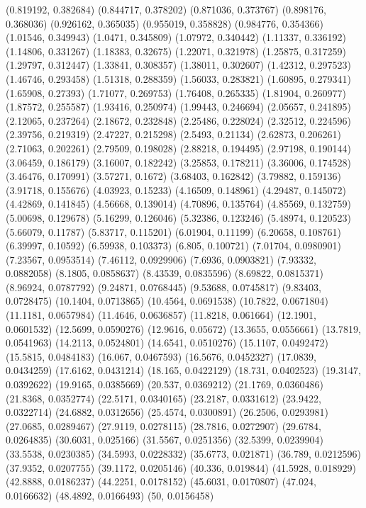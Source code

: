 {(0.819192, 0.382684)
(0.844717, 0.378202)
(0.871036, 0.373767)
(0.898176, 0.368036)
(0.926162, 0.365035)
(0.955019, 0.358828)
(0.984776, 0.354366)
(1.01546, 0.349943)
(1.0471, 0.345809)
(1.07972, 0.340442)
(1.11337, 0.336192)
(1.14806, 0.331267)
(1.18383, 0.32675)
(1.22071, 0.321978)
(1.25875, 0.317259)
(1.29797, 0.312447)
(1.33841, 0.308357)
(1.38011, 0.302607)
(1.42312, 0.297523)
(1.46746, 0.293458)
(1.51318, 0.288359)
(1.56033, 0.283821)
(1.60895, 0.279341)
(1.65908, 0.27393)
(1.71077, 0.269753)
(1.76408, 0.265335)
(1.81904, 0.260977)
(1.87572, 0.255587)
(1.93416, 0.250974)
(1.99443, 0.246694)
(2.05657, 0.241895)
(2.12065, 0.237264)
(2.18672, 0.232848)
(2.25486, 0.228024)
(2.32512, 0.224596)
(2.39756, 0.219319)
(2.47227, 0.215298)
(2.5493, 0.21134)
(2.62873, 0.206261)
(2.71063, 0.202261)
(2.79509, 0.198028)
(2.88218, 0.194495)
(2.97198, 0.190144)
(3.06459, 0.186179)
(3.16007, 0.182242)
(3.25853, 0.178211)
(3.36006, 0.174528)
(3.46476, 0.170991)
(3.57271, 0.1672)
(3.68403, 0.162842)
(3.79882, 0.159136)
(3.91718, 0.155676)
(4.03923, 0.15233)
(4.16509, 0.148961)
(4.29487, 0.145072)
(4.42869, 0.141845)
(4.56668, 0.139014)
(4.70896, 0.135764)
(4.85569, 0.132759)
(5.00698, 0.129678)
(5.16299, 0.126046)
(5.32386, 0.123246)
(5.48974, 0.120523)
(5.66079, 0.11787)
(5.83717, 0.115201)
(6.01904, 0.11199)
(6.20658, 0.108761)
(6.39997, 0.10592)
(6.59938, 0.103373)
(6.805, 0.100721)
(7.01704, 0.0980901)
(7.23567, 0.0953514)
(7.46112, 0.0929906)
(7.6936, 0.0903821)
(7.93332, 0.0882058)
(8.1805, 0.0858637)
(8.43539, 0.0835596)
(8.69822, 0.0815371)
(8.96924, 0.0787792)
(9.24871, 0.0768445)
(9.53688, 0.0745817)
(9.83403, 0.0728475)
(10.1404, 0.0713865)
(10.4564, 0.0691538)
(10.7822, 0.0671804)
(11.1181, 0.0657984)
(11.4646, 0.0636857)
(11.8218, 0.061664)
(12.1901, 0.0601532)
(12.5699, 0.0590276)
(12.9616, 0.05672)
(13.3655, 0.0556661)
(13.7819, 0.0541963)
(14.2113, 0.0524801)
(14.6541, 0.0510276)
(15.1107, 0.0492472)
(15.5815, 0.0484183)
(16.067, 0.0467593)
(16.5676, 0.0452327)
(17.0839, 0.0434259)
(17.6162, 0.0431214)
(18.165, 0.0422129)
(18.731, 0.0402523)
(19.3147, 0.0392622)
(19.9165, 0.0385669)
(20.537, 0.0369212)
(21.1769, 0.0360486)
(21.8368, 0.0352774)
(22.5171, 0.0340165)
(23.2187, 0.0331612)
(23.9422, 0.0322714)
(24.6882, 0.0312656)
(25.4574, 0.0300891)
(26.2506, 0.0293981)
(27.0685, 0.0289467)
(27.9119, 0.0278115)
(28.7816, 0.0272907)
(29.6784, 0.0264835)
(30.6031, 0.025166)
(31.5567, 0.0251356)
(32.5399, 0.0239904)
(33.5538, 0.0230385)
(34.5993, 0.0228332)
(35.6773, 0.021871)
(36.789, 0.0212596)
(37.9352, 0.0207755)
(39.1172, 0.0205146)
(40.336, 0.019844)
(41.5928, 0.018929)
(42.8888, 0.0186237)
(44.2251, 0.0178152)
(45.6031, 0.0170807)
(47.024, 0.0166632)
(48.4892, 0.0166493)
(50, 0.0156458)
}

